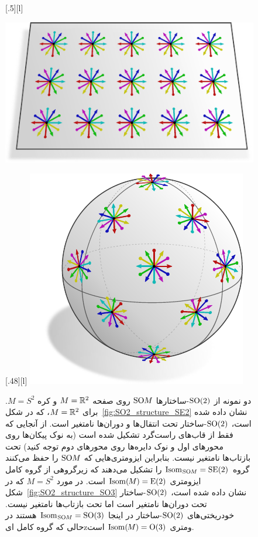 \begin{figure}
    \centering
        [.5\linewidth][l]{
            \includegraphics[width=.5\textwidth]{figures/SO2_structure_SE2.pdf}
            \rule{0pt}{20pt}
        }
        [.48\linewidth][l]{
            \includegraphics[width=.4\textwidth]{figures/SO2_structure_SO3.pdf}
        }
    \caption[]{\small
        دو نمونه از $\operatorname{SO}(2)$-ساختارها $\operatorname{SO}\mkern-3.6muM$ روی صفحه $M = \mathbb{R}^2$ و کره $M = S^2$.
        برای ${M = \mathbb{R}^2}$، که در شکل~\ref{fig:SO2_structure_SE2} نشان داده شده است، $\operatorname{SO}(2)$-ساختار تحت انتقال‌ها و دوران‌ها نامتغیر است.
        از آنجایی که فقط از قاب‌های راست‌گرد تشکیل شده است (به نوک پیکان‌ها روی محورهای اول و نوک دایره‌ها روی محورهای دوم توجه کنید) تحت بازتاب‌ها نامتغیر نیست.
        بنابراین ایزومتری‌هایی که $\operatorname{SO}\mkern-3.6muM$ را حفظ می‌کنند گروه $\operatorname{Isom}_{\mkern1mu\operatorname{SO}\mkern-3.6muM} = \operatorname{SE}(2)$ را تشکیل می‌دهند که زیرگروهی از گروه کامل ایزومتری $\operatorname{Isom}(\mkern-1.5mu M \mkern-.5mu) = \operatorname{E}(2)$ است.
        در مورد $M = S^2$ که در شکل~\ref{fig:SO2_structure_SO3} نشان داده شده است، $\operatorname{SO}(2)$-ساختار تحت دوران‌ها نامتغیر است اما تحت بازتاب‌ها نامتغیر نیست.
        خودریختی‌های $\operatorname{SO}(2)$-ساختار در اینجا $\operatorname{Isom}_{\mkern1mu\operatorname{SO}\mkern-3.6muM} = \operatorname{SO}(3)$ هستند در حالی که گروه کامل ایzومتری $\operatorname{Isom}(\mkern-1.5mu M \mkern-.5mu) = \operatorname{O}(3)$ است.
        }
    \label{fig:SO2_structures_SE2_SO3}
\end{figure}















